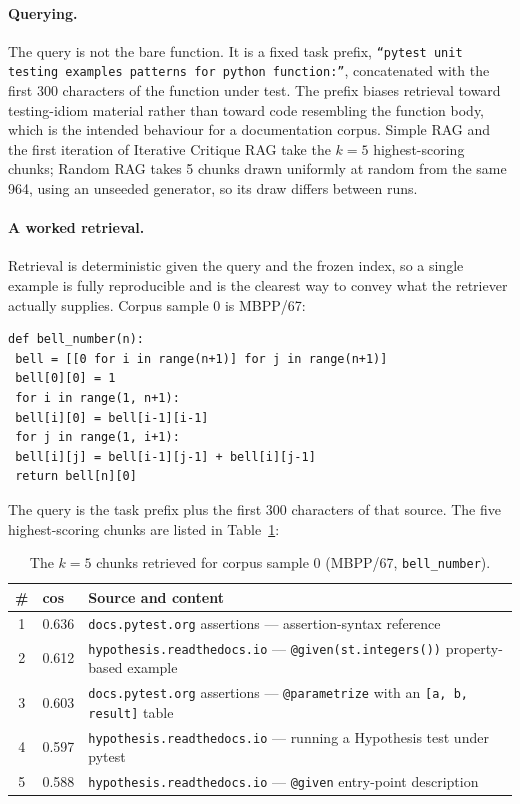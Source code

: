 \documentclass[smallextended]{svjour3}
\begin{document}
\paragraph{Querying.} The query is not the bare function. It is a
fixed task prefix, \texttt{``pytest unit testing examples patterns for
python function:''}, concatenated with the first 300 characters of the
function under test. The prefix biases retrieval toward
testing-idiom material rather than toward code resembling the function
body, which is the intended behaviour for a documentation corpus.
Simple RAG and the first iteration of Iterative Critique RAG take the
$k = 5$ highest-scoring chunks; Random RAG takes 5 chunks drawn
uniformly at random from the same 964, using an unseeded generator, so
its draw differs between runs.

\paragraph{A worked retrieval.} Retrieval is deterministic given
the query and the frozen index, so a single example is fully
reproducible and is the clearest way to convey what the retriever
actually supplies. Corpus sample 0 is MBPP/67:

\begin{verbatim}
def bell_number(n):
 bell = [[0 for i in range(n+1)] for j in range(n+1)]
 bell[0][0] = 1
 for i in range(1, n+1):
 bell[i][0] = bell[i-1][i-1]
 for j in range(1, i+1):
 bell[i][j] = bell[i-1][j-1] + bell[i][j-1]
 return bell[n][0]
\end{verbatim}

\noindent The query is the task prefix plus the first 300 characters
of that source. The five highest-scoring chunks are listed in
Table~\ref{tab:retrieval-example}:

\begin{table}[htbp]
\centering
\caption{The $k = 5$ chunks retrieved for corpus sample 0
(MBPP/67, \texttt{bell\_number}).}\label{tab:retrieval-example}
\footnotesize
\begin{tabular}{@{}clp{}@{}}
\toprule
\# & cos & Source and content \\
\midrule
1 & 0.636 & \texttt{docs.pytest.org} assertions --- assertion-syntax reference \\
2 & 0.612 & \texttt{hypothesis.readthedocs.io} --- \texttt{@given(st.integers())} property-based example \\
3 & 0.603 & \texttt{docs.pytest.org} assertions --- \texttt{@parametrize} with an \texttt{[a, b, result]} table \\
4 & 0.597 & \texttt{hypothesis.readthedocs.io} --- running a Hypothesis test under pytest \\
5 & 0.588 & \texttt{hypothesis.readthedocs.io} --- \texttt{@given} entry-point description \\
\bottomrule
\end{tabular}
\end{table}
\end{document}
